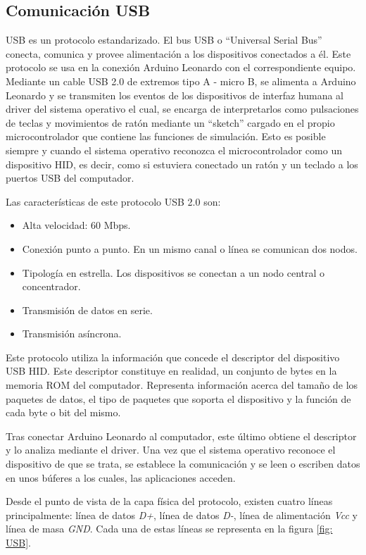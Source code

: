 \subsection{Comunicación USB} %

USB es un protocolo estandarizado. El bus USB o ``Universal Serial Bus'' conecta, comunica y provee alimentación a los dispositivos conectados a él. Este protocolo se usa en la conexión Arduino Leonardo con el correspondiente equipo. Mediante un cable USB 2.0 de extremos tipo A - micro B, se alimenta a Arduino Leonardo y se transmiten los eventos de los dispositivos de interfaz humana al driver del sistema operativo el cual, se encarga de interpretarlos como pulsaciones de teclas y movimientos de ratón mediante un ``sketch'' cargado en el propio microcontrolador que contiene las funciones de simulación. Esto es posible siempre y cuando el sistema operativo reconozca el microcontrolador como un dispositivo HID, es decir, como si estuviera conectado un ratón y un teclado a los puertos USB del computador.

Las características de este protocolo USB 2.0 son:
\begin{itemize}
    \item Alta velocidad: 60 Mbps.
    \item Conexión punto a punto. En un mismo canal o línea se comunican dos nodos. 
    \item Tipología en estrella. Los dispositivos se conectan a un nodo central o concentrador.
    \item Transmisión de datos en serie.
    \item Transmisión asíncrona.
\end{itemize}

Este protocolo utiliza la información que concede el descriptor del dispositivo USB HID. Este descriptor constituye en realidad, un conjunto de bytes en la memoria ROM del computador. Representa información acerca del tamaño de los paquetes de datos, el tipo de paquetes que soporta el dispositivo y la función de cada byte o bit del mismo. 

Tras conectar Arduino Leonardo al computador, este último obtiene el descriptor y lo analiza mediante el driver. Una vez que el sistema operativo reconoce el dispositivo de que se trata, se establece la comunicación y se leen o escriben datos en unos búferes a los cuales, las aplicaciones acceden.

Desde el punto de vista de la capa física del protocolo, existen cuatro líneas principalmente: línea de datos {\itshape D+}, línea de datos {\itshape D-}, línea de alimentación {\itshape Vcc} y línea de masa {\itshape GND}. Cada una de estas líneas se representa en la figura \ref{fig: USB}.

